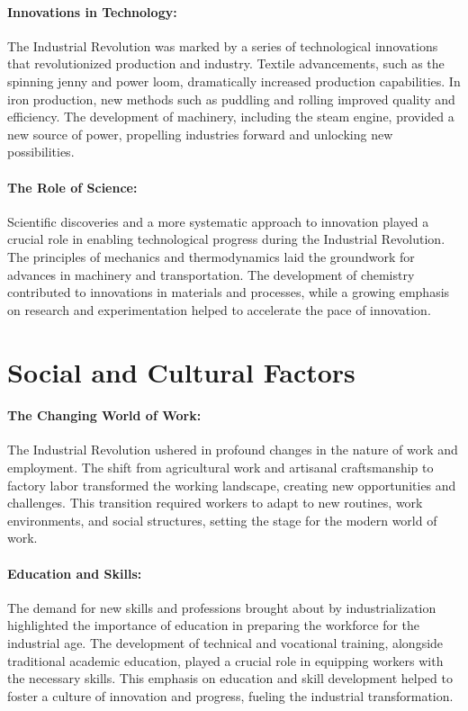 \documentclass[a4paper,12pt]{book}
\begin{document}
\paragraph{Innovations in Technology:}
The Industrial Revolution was marked by a series of technological innovations that revolutionized production and industry. Textile advancements, such as the spinning jenny and power loom, dramatically increased production capabilities. In iron production, new methods such as puddling and rolling improved quality and efficiency. The development of machinery, including the steam engine, provided a new source of power, propelling industries forward and unlocking new possibilities.

\paragraph{The Role of Science:}
Scientific discoveries and a more systematic approach to innovation played a crucial role in enabling technological progress during the Industrial Revolution. The principles of mechanics and thermodynamics laid the groundwork for advances in machinery and transportation. The development of chemistry contributed to innovations in materials and processes, while a growing emphasis on research and experimentation helped to accelerate the pace of innovation.

\section*{Social and Cultural Factors}

\paragraph{The Changing World of Work:}
The Industrial Revolution ushered in profound changes in the nature of work and employment. The shift from agricultural work and artisanal craftsmanship to factory labor transformed the working landscape, creating new opportunities and challenges. This transition required workers to adapt to new routines, work environments, and social structures, setting the stage for the modern world of work.

\paragraph{Education and Skills:}
The demand for new skills and professions brought about by industrialization highlighted the importance of education in preparing the workforce for the industrial age. The development of technical and vocational training, alongside traditional academic education, played a crucial role in equipping workers with the necessary skills. This emphasis on education and skill development helped to foster a culture of innovation and progress, fueling the industrial transformation.
\end{document}
